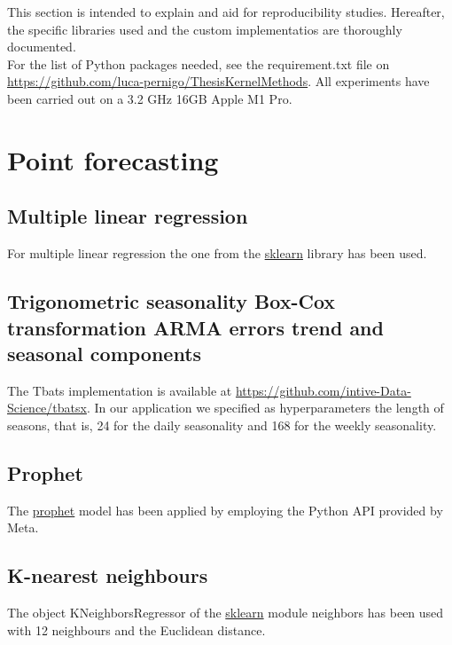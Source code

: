 This section is intended to explain and aid for reproducibility studies. Hereafter, the specific libraries used and the custom implementatios are thoroughly documented.
\\
For the list of Python packages needed, see the requirement.txt file on \url{https://github.com/luca-pernigo/ThesisKernelMethods}\label{github_repo}.
All experiments have been carried out on a 3.2 GHz 16GB Apple M1 Pro.







\section{Point forecasting}
\subsection{Multiple linear regression}
For multiple linear regression the one from the \href{https://scikit-learn.org/stable/}{sklearn} library has been used.

\subsection{Trigonometric seasonality Box-Cox transformation ARMA errors trend and seasonal components}
The Tbats implementation is available at \href{https://github.com/intive-DataScience/tbats}{https://github.com/intive-Data-Science/tbatsx}.
In our application we specified as hyperparameters the length of seasons, that is, 24 for the daily seasonality and 168 for the weekly seasonality.

\subsection{Prophet}
The \href{https://facebook.github.io/prophet/docs/quick_start.html}{prophet} model has been applied by employing the Python API provided by Meta.

\subsection{K-nearest neighbours}
The object KNeighborsRegressor of the \href{https://scikit-learn.org/stable/}{sklearn} module neighbors has been used with 12 neighbours and the Euclidean distance.

